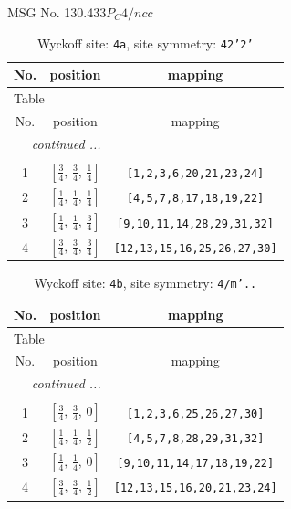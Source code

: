 \documentclass[fleqn,8pt]{jsarticle}
\begin{document}
\setcounter{MaxMatrixCols}{32}

\renewcommand{\tablename}{Table~}
\renewcommand{\figurename}{Figure~}
\begin{center}
\LARGE
MSG No. 130.433\quad$P_{C}4/ncc$
\end{center}
\renewcommand{\arraystretch}{1.2}
\begin{longtable}{ccc}
\caption{Wyckoff site: {\tt 4a}, site symmetry: {\tt 42'2'}}
 \\
 \hline \hline
No. & position & mapping \\ \hline \endfirsthead

\multicolumn{2}{l}{\tablename\ \thetable{}} \\
 \hline \hline
No. & position & mapping \\ \hline \endhead

 \hline \hline
\multicolumn{2}{r}{\footnotesize\it continued ...} \\ \endfoot

 \hline \hline
\multicolumn{2}{r}{} \\ \endlastfoot

1 & $\left[ \frac{3}{4},\, \frac{3}{4},\, \frac{1}{4} \right]$ & {\tt [1,2,3,6,20,21,23,24]} \\ \hline
2 & $\left[ \frac{1}{4},\, \frac{1}{4},\, \frac{1}{4} \right]$ & {\tt [4,5,7,8,17,18,19,22]} \\ \hline
3 & $\left[ \frac{1}{4},\, \frac{1}{4},\, \frac{3}{4} \right]$ & {\tt [9,10,11,14,28,29,31,32]} \\ \hline
4 & $\left[ \frac{3}{4},\, \frac{3}{4},\, \frac{3}{4} \right]$ & {\tt [12,13,15,16,25,26,27,30]} \\
\end{longtable}
\renewcommand{\arraystretch}{1.2}
\begin{longtable}{ccc}
\caption{Wyckoff site: {\tt 4b}, site symmetry: {\tt 4/m'..}}
 \\
 \hline \hline
No. & position & mapping \\ \hline \endfirsthead

\multicolumn{2}{l}{\tablename\ \thetable{}} \\
 \hline \hline
No. & position & mapping \\ \hline \endhead

 \hline \hline
\multicolumn{2}{r}{\footnotesize\it continued ...} \\ \endfoot

 \hline \hline
\multicolumn{2}{r}{} \\ \endlastfoot

1 & $\left[ \frac{3}{4},\, \frac{3}{4},\, 0 \right]$ & {\tt [1,2,3,6,25,26,27,30]} \\ \hline
2 & $\left[ \frac{1}{4},\, \frac{1}{4},\, \frac{1}{2} \right]$ & {\tt [4,5,7,8,28,29,31,32]} \\ \hline
3 & $\left[ \frac{1}{4},\, \frac{1}{4},\, 0 \right]$ & {\tt [9,10,11,14,17,18,19,22]} \\ \hline
4 & $\left[ \frac{3}{4},\, \frac{3}{4},\, \frac{1}{2} \right]$ & {\tt [12,13,15,16,20,21,23,24]} \\
\end{longtable}
\end{document}
